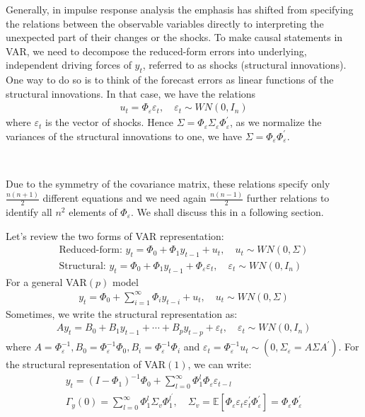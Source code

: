 Generally, in impulse response analysis the emphasis has shifted from specifying the relations
between the observable variables directly to interpreting the
unexpected part of their changes or the shocks. 
To make causal statements in VAR, we need to decompose the reduced-form errors into underlying, independent driving forces of $y_t$, referred to as shocks (structural innovations).
One way to do so is to think of the forecast errors as linear functions of the structural innovations.
In that case, we have the relations
\begin{gather*}
    u_t = \Phi_{\varepsilon} \varepsilon_t, \quad \varepsilon_t \sim WN(0, I_n)
\end{gather*}
where $\varepsilon_t$ is the vector of shocks. Hence $\Sigma = \Phi_{\varepsilon} \Sigma_{\varepsilon} \Phi_{\varepsilon}^{\prime}$,
as we normalize the variances of the structural innovations to one,
we have $\Sigma = \Phi_{\varepsilon} \Phi_{\varepsilon}^{\prime}$.

\begin{note}
    \

    Due to the symmetry of the covariance matrix, these relations specify only $\frac{n(n+1)}{2}$ different equations
and we need again $\frac{n(n-1)}{2}$ further relations to identify all $n^2$ elements of $\Phi_{\varepsilon}$.
We shall discuss this in a following section.
\end{note}

Let's review the two forms of VAR representation:
\begin{gather*}
    \text{Reduced-form: } y_t = \Phi_0 + \Phi_1 y_{t-1} + u_t, \quad u_t \sim WN(0, \Sigma) \\
    \text{Structural: } y_t = \Phi_0 + \Phi_1 y_{t-1} + \Phi_{\varepsilon} \varepsilon_t, \quad \varepsilon_t \sim WN(0, I_n)
\end{gather*}
For a general VAR$(p)$ model
\begin{gather*}
    y_t = \Phi_0 + \sum_{i=1}^{\infty} \Phi_i y_{t-i} + u_t, \quad u_t \sim WN(0, \Sigma)
\end{gather*}
Sometimes, we write the structural representation as:
\begin{gather*}
    A y_t = B_0 + B_1 y_{t-1} + \cdots + B_p y_{t-p} + \varepsilon_t, \quad \varepsilon_t \sim WN(0, I_n)
\end{gather*}
where $A = \Phi_{\varepsilon}^{-1} , B_0 = \Phi_{\varepsilon}^{-1} \Phi_0, B_i = \Phi_{\varepsilon}^{-1} \Phi_i$ and $\varepsilon_t = \Phi_{\varepsilon}^{-1} u_t \sim \left(0, \Sigma_{\varepsilon} = A \Sigma A^{\prime} \right).$
For the structural representation of VAR$(1)$, we can write:
\begin{gather*}
    y_t = \left(I - \Phi_1\right)^{-1} \Phi_0 + \sum_{l=0}^{\infty} \Phi_1^l \Phi_{\varepsilon} \varepsilon_{t-l}  \\
    \Gamma_y(0) = \sum_{l=0}^{\infty} \Phi_1^l \Sigma_v \Phi_1^{l^\prime}, \quad \Sigma_v = \mathbb{E}\left[\Phi_{\varepsilon}\varepsilon_t \varepsilon_t^{\prime} \Phi_{\varepsilon}^{\prime} \right] = \Phi_{\varepsilon} \Phi_{\varepsilon}^{\prime}
\end{gather*}

